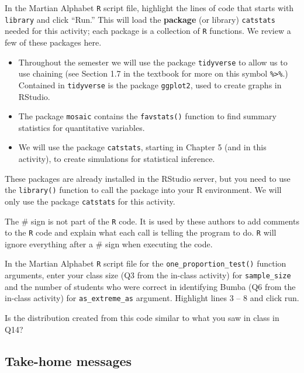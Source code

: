 \documentclass[
]{report}
\providecommand{\tightlist}{%
  \setlength{\itemsep}{0pt}\setlength{\parskip}{0pt}}
\begin{document}
In the Martian Alphabet \texttt{R} script file, highlight the lines of code that starts with \texttt{library} and click ``Run.'' This will load the \textbf{package} (or library) \texttt{catstats} needed for this activity; each package is a collection of \texttt{R} functions. We review a few of these packages here.

\begin{itemize}
\tightlist
\item
  Throughout the semester we will use the package \texttt{tidyverse} to allow us to use chaining (see Section 1.7 in the textbook for more on this symbol \texttt{\%\textgreater{}\%}.) Contained in \texttt{tidyverse} is the package \texttt{ggplot2}, used to create graphs in RStudio.
\item
  The package \texttt{mosaic} contains the \texttt{favstats()} function to find summary statistics for quantitative variables.
\item
  We will use the package \texttt{catstats}, starting in Chapter 5 (and in this activity), to create simulations for statistical inference.
\end{itemize}

These packages are already installed in the RStudio server, but you need to use the \texttt{library()} function to call the package into your R environment. We will only use the package \texttt{catstats} for this activity.

The \# sign is not part of the \texttt{R} code.
It is used by these authors to add comments to the \texttt{R} code and explain what each call is telling the program to do.
\texttt{R} will ignore everything after a \# sign when executing the code.

In the Martian Alphabet \texttt{R} script file for the \texttt{one\_proportion\_test()} function arguments, enter your class size (Q3 from the in-class activity) for \texttt{sample\_size} and the number of students who were correct in identifying Bumba (Q6 from the in-class activity) for \texttt{as\_extreme\_as} argument. Highlight lines 3 -- 8 and click run.

Is the distribution created from this code similar to what you saw in class in Q14?

\vspace{0.3in}

\hypertarget{take-home-messages}{%
\subsection{Take-home messages}\label{take-home-messages}}
\end{document}
